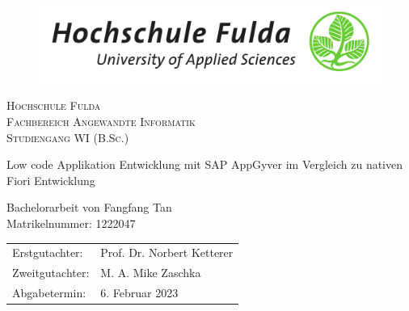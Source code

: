 

\begin{titlepage}

\begin{figure} [t!]
    \centering
    \includegraphics[width=0.75\columnwidth]{Bilder/HSFuldaLogo}
    \vspace{0.8cm}
\end{figure}

\begin{center}
  \linespread{1.3}\scshape
  \LARGE{Hochschule Fulda}\\
  \Large{Fachbereich Angewandte Informatik \\
             Studiengang WI (B.Sc.)}
\end{center}

\vspace{1.3cm}

\begin{center}
\huge\sffamily Low code Applikation Entwicklung mit SAP AppGyver im Vergleich zu nativen Fiori Entwicklung
\end{center}

\vspace{1.2cm}
  
\begin{center}
\sffamily\linespread{1.3}
  \LARGE{Bachelorarbeit von Fangfang Tan}\\
  \Large{Matrikelnummer: 1222047}
\end{center}

\vspace{1.7cm}
  
\begin{center}
\sffamily\large
    \begin{tabular}{ll}
      Erstgutachter: & Prof. Dr. Norbert Ketterer \\
      Zweitgutachter: & M. A. Mike Zaschka \\
      Abgabetermin: & 6. Februar 2023
    \end{tabular}
\end{center}


\end{titlepage}

